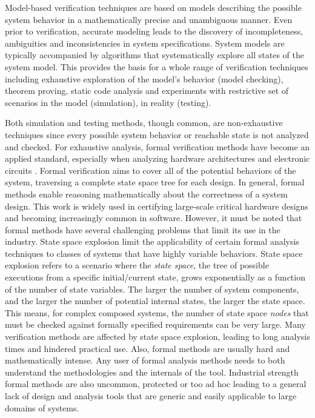 Model-based verification techniques are based on models describing the possible
system behavior in a mathematically precise and unambiguous manner. Even prior
to verification, accurate modeling leads to the discovery of incompleteness,
ambiguities and inconsistencies in system specifications. System models are
typically accompanied by algorithms that systematically explore all states of
the system model. This provides the basis for a whole range of verification
techniques including exhaustive exploration of the model's behavior (model
checking), theorem proving, static code analysis and experiments with
restrictive set of scenarios in the model (simulation), in reality (testing).

Both simulation and testing methods, though common, are non-exhaustive
techniques since every possible system behavior or reachable state is not
analyzed and checked. For exhaustive analysis, formal verification methods have
become an applied standard, especially when analyzing hardware architectures
and electronic circuits \cite{chen1996verification, appenzeller1995formal}.
Formal verification aims to cover all of the potential behaviors of the system,
traversing a complete state space tree for each design. In general, formal
methods enable reasoning mathematically about the correctness of a system
design. This work is widely used in certifying large-scale critical hardware
designs and becoming increasingly common in software. However, it must be noted
that formal methods have several challenging problems that limit its use in the
industry. State space explosion limit the applicability of certain formal
analysis techniques to classes of systems that have highly variable behaviors.
State space explosion refers to a scenario where the \emph{state space}, the
tree of possible executions from a specific initial/current state, grows
exponentially as a function of the number of state variables. The larger the
number of system components, and the larger the number of potential internal
states, the larger the state space. This means, for complex composed systems,
the number of state space \emph{nodes} that must be checked against formally
specified requirements can be very large. Many verification methods are affected
by state space explosion, leading to long analysis times and hindered practical
use. Also, formal methods are usually hard and mathematically intense. Any user
of formal analysis methods needs to both understand the methodologies and the
internals of the tool. Industrial strength formal methods are also uncommon,
protected or too ad hoc leading to a general lack of design and analysis tools
that are generic and easily applicable to large domains of systems.

